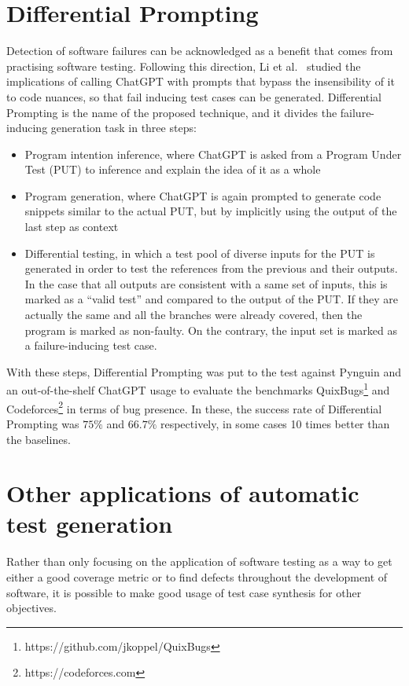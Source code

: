\documentclass[%
  chapterprefix=false,%
  open=right,%
  twoside=true,%
  paper=a4,%
  logofile={Figures/logo.png},%
  thesistype=master,%
  UKenglish,%
]{se2thesis}
\begin{document}
\section{Differential Prompting}

Detection of software failures can be acknowledged as a benefit that comes from practising software testing.
Following this direction, Li et al.~\cite{li2023nuances} studied the implications of calling ChatGPT with prompts that bypass the insensibility of it to code nuances, so that fail inducing test cases can be generated.
Differential Prompting is the name of the proposed technique, and it divides the failure-inducing generation task in three steps:

\begin{itemize}
  \item Program intention inference, where ChatGPT is asked from a Program Under Test (PUT) to inference and explain the idea of it as a whole
  \item Program generation, where ChatGPT is again prompted to generate code snippets similar to the actual PUT, but by implicitly using the output of the last step as context
  \item Differential testing, in which a test pool of diverse inputs for the PUT is generated in order to test the references from the previous and their outputs.
  In the case that all outputs are consistent with a same set of inputs, this is marked as a ``valid test'' and compared to the output of the PUT.\@
  If they are actually the same and all the branches were already covered, then the program is marked as non-faulty.
  On the contrary, the input set is marked as a failure-inducing test case.
\end{itemize}

With these steps, Differential Prompting was put to the test against Pynguin and an out-of-the-shelf ChatGPT usage to evaluate the benchmarks QuixBugs\footnote{https://github.com/jkoppel/QuixBugs} and Codeforces\footnote{https://codeforces.com} in terms of bug presence.
In these, the success rate of Differential Prompting was \(75\%\) and \(66.7\%\) respectively, in some cases 10 times better than the baselines.

\section{Other applications of automatic test generation}

Rather than only focusing on the application of software testing as a way to get either a good coverage metric or to find defects throughout the development of software, it is possible to make good usage of test case synthesis for other objectives.
\end{document}

